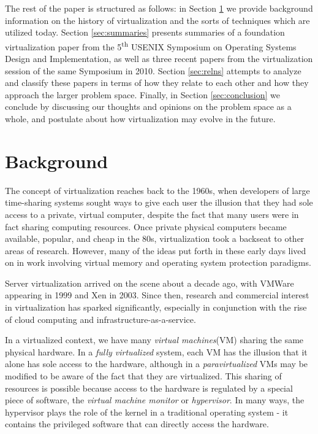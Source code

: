 \documentclass[letterpaper, twocolumn]{article}
\begin{document}
The rest of the paper is structured as follows: in Section \ref{sec:background}
we provide background information on the history of virtualization and the
sorts of techniques which are utilized today.  Section \ref{sec:summaries}
presents summaries of a foundation virtualization paper from the
5\textsuperscript{th} USENIX Symposium on Operating Systems Design
and Implementation, as well as three recent papers from the virtualization
session of the same Symposium in 2010.  Section \ref{sec:relns} attempts
to analyze and classify these papers in terms of how they
relate to each other and how they approach the larger problem space.
Finally, in Section \ref{sec:conclusion} we conclude by discussing our
thoughts and opinions on the problem space as a whole, and postulate
about how virtualization may evolve in the future.

\section{Background}
\label{sec:background}

The concept of virtualization reaches back to the 1960s, when developers
of large time-sharing systems sought ways to give each user the illusion that
they had sole access to a private, virtual computer, despite the fact that
many users were in fact sharing computing resources.  Once private physical
computers became available, popular, and cheap in the 80s, virtualization
took a backseat to other areas of research.  However, many of the ideas
put forth in these early days lived on in work involving virtual memory
and operating system protection paradigms.

Server virtualization arrived on the scene about a decade ago, with VMWare
appearing in 1999 and Xen in 2003.  Since then, research and commercial interest
in virtualization has sparked significantly, especially in conjunction
with the rise of cloud computing and infrastructure-as-a-service.

In a virtualized context, we have many \emph{virtual machines}(VM) sharing the same
physical hardware.  In a \emph{fully virtualized} system, each VM has the illusion
that it alone has sole access to the hardware, although in a \emph{paravirtualized}
VMs may be modified to be aware of the fact that they are virtualized.  This
sharing of resources is possible because access to the hardware is regulated by
a special piece of software, the \emph{virtual machine monitor} or \emph{hypervisor}.
In many ways, the hypervisor plays the role of the kernel in a traditional operating
system - it contains the privileged software that can directly access the hardware.
\end{document}
